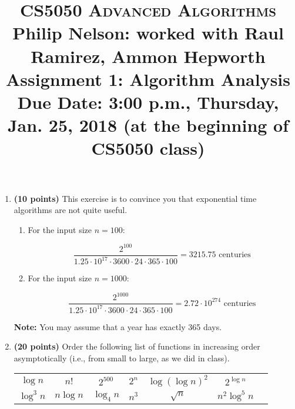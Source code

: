 \documentclass[11pt]{article}
\begin{document}
\baselineskip=14.0pt

\title{CS5050 \textsc{Advanced Algorithms}
\\{\Large Philip Nelson: worked with Raul Ramirez, Ammon Hepworth}
\\ Assignment 1: Algorithm Analysis
\\ {\large {\bf Due Date:} {\bf 3:00 p.m.}, Thursday, Jan. 25, 2018 ({\bf at the beginning of CS5050 class})}}
\date{}

\maketitle

\vspace{-0.5in}

\begin{enumerate}

\item
{ \bf (10 points)}
This exercise is to convince you that exponential time algorithms are not quite useful.

\begin{enumerate}

\item
For the input size $n=100$:

\[\frac{2^{100}}{1.25\cdot 10^{17}\cdot 3600 \cdot 24 \cdot 365 \cdot 100} = 3215.75 \text{ centuries}\]

\item
For the input size $n=1000$:

\[\frac{2^{1000}}{1.25\cdot10^{17}\cdot 3600 \cdot 24 \cdot 365 \cdot 100} = 2.72\cdot 10^{274} \text{ centuries}\]
\end{enumerate}

{\bf Note:} You may assume that a year has exactly 365 days.

\item
{\bf (20 points)}
Order the following list of functions in increasing order asymptotically (i.e., from small to large, as we did in class).


\begin{table}[h]
\begin{center}
\begin{tabular}{ccccccc}
	$\log n$ & $n!$ & $2^{500}$ &  $2^n$ & $\log(\log n)^2$
					& $2^{\log n}$\\
$\log^3n$  & $n\log n$   &  $\log_4n$   & $n^3$   &
$\sqrt{n}$  & $n^2\log^5 n$  \\
\end{tabular}
\end{center}
\end{table}


\end{enumerate}
\end{document}

